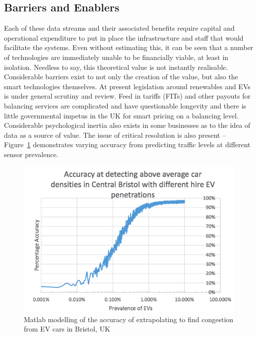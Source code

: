 \documentclass[conference]{IEEEtran}
\begin{document}
\subsection{Barriers and Enablers}

Each of these data streams and their associated benefits require
capital and operational expenditure to put in place the infrastructure
and staff that would facilitate the systems. Even without estimating
this, it can be seen that a number of technologies are immediately
unable to be financially viable, at least in isolation. Needless to
say, this theoretical value is not instantly realisable. Considerable
barriers exist to not only the creation of the value, but also the
smart technologies themselves. At present legislation around
renewables and EVs is under general scrutiny and review. Feed in
tariffs (FITs) and other payouts for balancing services are
complicated and have questionable longevity and there is little
governmental impetus in the UK for smart pricing on a balancing
level. Considerable psychological inertia also exists in some
businesses as to the idea of data as a source of value.  The issue of
critical resolution is also present --
Figure~\ref{fig:bristolcardensity} demonstrates varying accuracy from
predicting traffic levels at different sensor prevalence.


\begin{figure}[!htp]
\centering
\includegraphics[width=\columnwidth]{images/bristolcardensity.png}
\caption{Matlab modelling of the accuracy of extrapolating to find
  congestion from EV cars in Bristol, UK}
\label{fig:bristolcardensity}
\end{figure}
\end{document}
